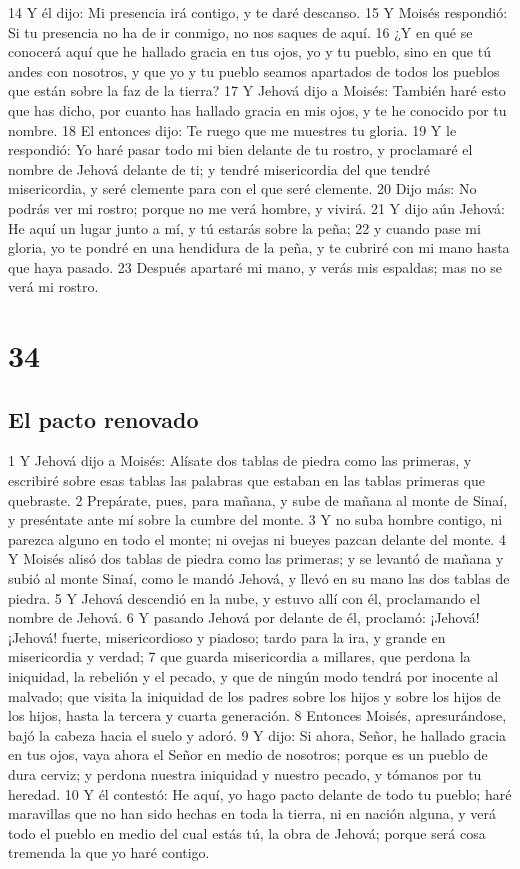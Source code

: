14 Y él dijo: Mi presencia irá contigo, y te daré descanso.
15 Y Moisés respondió: Si tu presencia no ha de ir conmigo, no nos saques de aquí.
16 ¿Y en qué se conocerá aquí que he hallado gracia en tus ojos, yo y tu pueblo, sino en que tú andes con nosotros, y que yo y tu pueblo seamos apartados de todos los pueblos que están sobre la faz de la tierra?
17 Y Jehová dijo a Moisés: También haré esto que has dicho, por cuanto has hallado gracia en mis ojos, y te he conocido por tu nombre.
18 El entonces dijo: Te ruego que me muestres tu gloria.
19 Y le respondió: Yo haré pasar todo mi bien delante de tu rostro, y proclamaré el nombre de Jehová delante de ti; y tendré misericordia del que tendré misericordia, y seré clemente para con el que seré clemente.
20 Dijo más: No podrás ver mi rostro; porque no me verá hombre, y vivirá.
21 Y dijo aún Jehová: He aquí un lugar junto a mí, y tú estarás sobre la peña;
22 y cuando pase mi gloria, yo te pondré en una hendidura de la peña, y te cubriré con mi mano hasta que haya pasado.
23 Después apartaré mi mano, y verás mis espaldas; mas no se verá mi rostro.

\chapter{34}

\section{El pacto renovado}

1 Y Jehová dijo a Moisés: Alísate dos tablas de piedra como las primeras, y escribiré sobre esas tablas las palabras que estaban en las tablas primeras que quebraste.
2 Prepárate, pues, para mañana, y sube de mañana al monte de Sinaí, y preséntate ante mí sobre la cumbre del monte.
3 Y no suba hombre contigo, ni parezca alguno en todo el monte; ni ovejas ni bueyes pazcan delante del monte.
4 Y Moisés alisó dos tablas de piedra como las primeras; y se levantó de mañana y subió al monte Sinaí, como le mandó Jehová, y llevó en su mano las dos tablas de piedra.
5 Y Jehová descendió en la nube, y estuvo allí con él, proclamando el nombre de Jehová.
6 Y pasando Jehová por delante de él, proclamó: ¡Jehová! ¡Jehová! fuerte, misericordioso y piadoso; tardo para la ira, y grande en misericordia y verdad;
7 que guarda misericordia a millares, que perdona la iniquidad, la rebelión y el pecado, y que de ningún modo tendrá por inocente al malvado; que visita la iniquidad de los padres sobre los hijos y sobre los hijos de los hijos, hasta la tercera y cuarta generación.
8 Entonces Moisés, apresurándose, bajó la cabeza hacia el suelo y adoró.
9 Y dijo: Si ahora, Señor, he hallado gracia en tus ojos, vaya ahora el Señor en medio de nosotros; porque es un pueblo de dura cerviz; y perdona nuestra iniquidad y nuestro pecado, y tómanos por tu heredad.
10 Y él contestó: He aquí, yo hago pacto delante de todo tu pueblo; haré maravillas que no han sido hechas en toda la tierra, ni en nación alguna, y verá todo el pueblo en medio del cual estás tú, la obra de Jehová; porque será cosa tremenda la que yo haré contigo.


